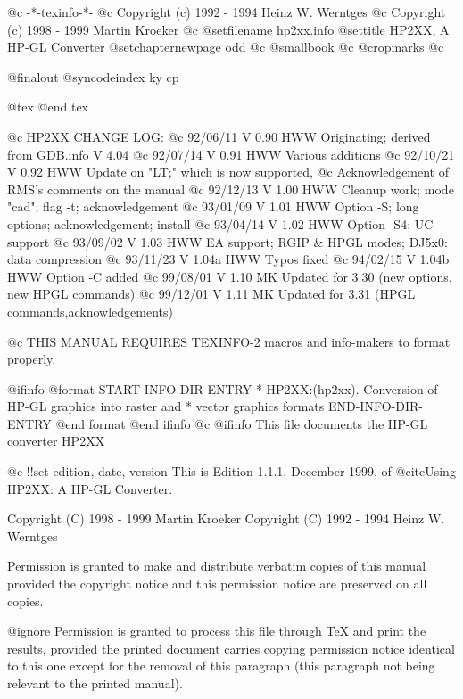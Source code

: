      @c -*-texinfo-*-
@c Copyright (c) 1992 - 1994  Heinz W. Werntges
@c Copyright (c) 1998 - 1999  Martin Kroeker
@c %
@setfilename hp2xx.info
@settitle HP2XX, A HP-GL Converter
@setchapternewpage odd
@c @smallbook
@c @cropmarks
@c %

@finalout
@syncodeindex ky cp

@tex
\xdef\manvers{$Revision: 1.1.1 $}  %
@end tex

@c HP2XX CHANGE LOG:
@c 92/06/11  V 0.90  HWW  Originating; derived from GDB.info V 4.04
@c 92/07/14  V 0.91  HWW  Various additions
@c 92/10/21  V 0.92  HWW  Update on "LT;" which is now supported,
@c                        Acknowledgement of RMS's comments on the manual
@c 92/12/13  V 1.00  HWW  Cleanup work; mode "cad"; flag -t; acknowledgement
@c 93/01/09  V 1.01  HWW  Option -S; long options; acknowledgement; install
@c 93/04/14  V 1.02  HWW  Option -S4; UC support
@c 93/09/02  V 1.03  HWW  EA support; RGIP & HPGL modes; DJ5x0: data compression
@c 93/11/23  V 1.04a HWW  Typos fixed
@c 94/02/15  V 1.04b HWW  Option -C added
@c 99/08/01  V 1.10  MK   Updated for 3.30 (new options, new HPGL commands)
@c 99/12/01  V 1.11  MK   Updated for 3.31 (HPGL commands,acknowledgements)

@c THIS MANUAL REQUIRES TEXINFO-2 macros and info-makers to format properly.

@ifinfo
@format
START-INFO-DIR-ENTRY
* HP2XX:(hp2xx).  Conversion of HP-GL graphics into raster and
*                 vector graphics formats
END-INFO-DIR-ENTRY
@end format
@end ifinfo
@c
@ifinfo
This file documents the HP-GL converter HP2XX

@c !!set edition, date, version
This is Edition 1.1.1, December 1999,
of @cite{Using HP2XX: A HP-GL Converter}.

Copyright (C) 1998 - 1999 Martin Kroeker
Copyright (C) 1992 - 1994 Heinz W. Werntges

Permission is granted to make and distribute verbatim copies of
this manual provided the copyright notice and this permission notice
are preserved on all copies.

@ignore
Permission is granted to process this file through TeX and print the
results, provided the printed document carries copying permission
notice identical to this one except for the removal of this paragraph
(this paragraph not being relevant to the printed manual).

